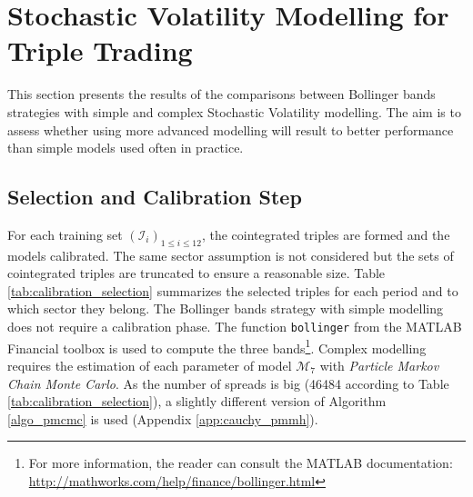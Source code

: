 \documentclass[11pt,a4,twosided,singlespacing,titlepagenumber=on]{scrreprt}
\numberwithin{equation}{chapter} %
\theoremstyle{remark}
\begin{document}
\section{Stochastic Volatility Modelling for Triple Trading}
This section presents the results of the comparisons between Bollinger bands strategies with simple and complex Stochastic Volatility modelling. The aim is to assess whether using more advanced modelling will result to better performance than simple models used often in practice. 

\subsection{Selection and Calibration Step}
For each training set $(\mathcal{I}_i)_{1 \leq i \leq 12}$, the cointegrated triples are formed and the models calibrated. The same sector assumption is not considered but the sets of cointegrated triples are truncated to ensure a reasonable size. Table \ref{tab:calibration_selection} summarizes the selected triples for each period and to which sector they belong. The Bollinger bands strategy with simple modelling does not require a calibration phase. The function \texttt{bollinger} from the MATLAB Financial toolbox is used to compute the three bands\footnote{For more information, the reader can consult the MATLAB documentation: \url{http://mathworks.com/help/finance/bollinger.html}}. Complex modelling requires the estimation of each parameter of model $\mathcal{M}_7$ with \textit{Particle Markov Chain Monte Carlo}. As the number of spreads is big (46484 according to Table \ref{tab:calibration_selection}), a slightly different version of Algorithm \ref{algo_pmcmc} is used (Appendix \ref{app:cauchy_pmmh}).
\end{document}
